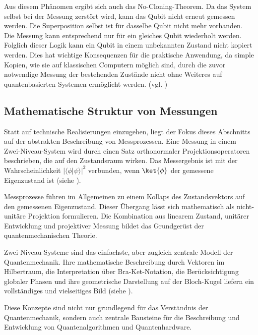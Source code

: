 Aus diesem Phänomen ergibt sich auch das No-Cloning-Theorem. Da das System selbst bei der Messung zerstört wird, kann das Qubit nicht erneut gemessen werden. Die Superposition selbst ist für dasselbe Qubit nicht mehr vorhanden. Die Messung kann entsprechend nur für ein gleiches Qubit wiederholt werden.
Folglich dieser Logik kann ein Qubit in einem unbekannten Zustand nicht kopiert werden. Dies hat wichtige Konsequenzen für die praktische Anwendung, da simple Kopien, wie sie auf klassischen Computern möglich sind, durch die zuvor notwendige Messung der bestehenden Zustände nicht ohne Weiteres auf quantenbasierten Systemen ermöglicht werden.
(vgl. \cite[Ch. 4.4]{hughes_quantum_2021})

\subsection{Mathematische Struktur von Messungen}
\label{subsec: Mathematische Struktur von Messungen}
Statt auf technische Realisierungen einzugehen, liegt der Fokus dieses Abschnitts auf der abstrakten Beschreibung von Messprozessen. Eine Messung in einem Zwei-Niveau-System wird durch einen Satz orthonormaler Projektionsoperatoren beschrieben, die auf den Zustandsraum wirken. Das Messergebnis ist mit der Wahrscheinlichkeit $|\langle\phi|\psi\rangle|^2$ verbunden, wenn $\ket{\phi}$ der gemessene Eigenzustand ist (siehe \cite[Kap 2.2] {nielsen_quantum_2010}).

Messprozesse führen im Allgemeinen zu einem Kollaps des Zustandsvektors auf den gemessenen Eigenzustand. Dieser Übergang lässt sich mathematisch als nicht-unitäre Projektion formulieren. Die Kombination aus linearem Zustand, unitärer Entwicklung und projektiver Messung bildet das Grundgerüst der quantenmechanischen Theorie.


Zwei-Niveau-Systeme sind das einfachste, aber zugleich zentrale Modell der Quantenmechanik. Ihre mathematische Beschreibung durch Vektoren im Hilbertraum, die Interpretation über Bra-Ket-Notation, die Berücksichtigung globaler Phasen und ihre geometrische Darstellung auf der Bloch-Kugel liefern ein vollständiges und vielseitiges Bild (siehe \cite[Kap 3.5] {greiner_quantenmechanik_nodate}).

Diese Konzepte sind nicht nur grundlegend für das Verständnis der Quantenmechanik, sondern auch zentrale Bausteine für die Beschreibung und Entwicklung von Quantenalgorithmen und Quantenhardware.



